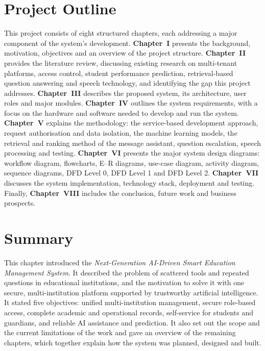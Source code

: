 \section{Project Outline}
This project consists of eight structured chapters, each addressing a major component of the system's development. \textbf{Chapter~I} presents the background, motivation, objectives and an overview of the project structure. \textbf{Chapter~II} provides the literature review, discussing existing research on multi-tenant platforms, access control, student performance prediction, retrieval-based question answering and speech technology, and identifying the gap this project addresses. \textbf{Chapter~III} describes the proposed system, its architecture, user roles and major modules. \textbf{Chapter~IV} outlines the system requirements, with a focus on the hardware and software needed to develop and run the system. \textbf{Chapter~V} explains the methodology: the service-based development approach, request authorisation and data isolation, the machine learning models, the retrieval and ranking method of the message assistant, question escalation, speech processing and testing. \textbf{Chapter~VI} presents the major system design diagrams: workflow diagram, flowcharts, E--R diagrams, use-case diagram, activity diagram, sequence diagrams, DFD Level 0, DFD Level 1 and DFD Level 2. \textbf{Chapter~VII} discusses the system implementation, technology stack, deployment and testing. Finally, \textbf{Chapter~VIII} includes the conclusion, future work and business prospects.

\section{Summary}
This chapter introduced the \textit{Next-Generation AI-Driven Smart Education Management System}. It described the problem of scattered tools and repeated questions in educational institutions, and the motivation to solve it with one secure, multi-institution platform supported by trustworthy artificial intelligence. It stated five objectives: unified multi-institution management, secure role-based access, complete academic and operational records, self-service for students and guardians, and reliable AI assistance and prediction. It also set out the scope and the current limitations of the work and gave an overview of the remaining chapters, which together explain how the system was planned, designed and built.
